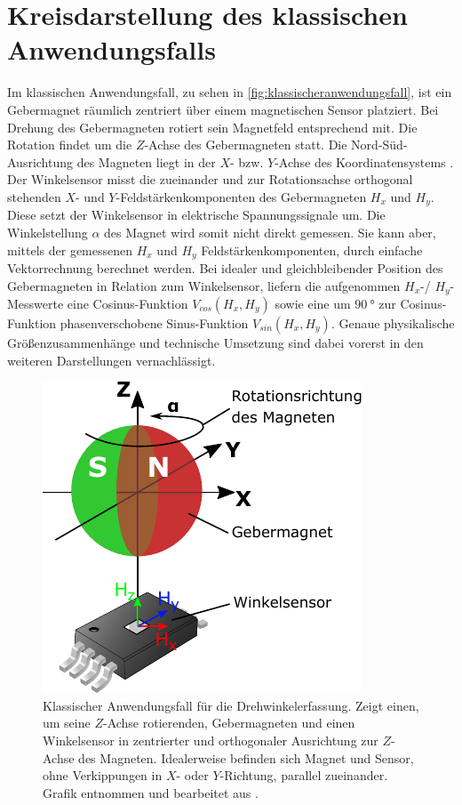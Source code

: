 %

\section{Kreisdarstellung des klassischen Anwendungsfalls}\label{sec:kreisdarstellung-anwendung}


Im klassischen Anwendungsfall, zu sehen in \autoref{fig:klassischeranwendungsfall}, ist ein Gebermagnet räumlich 
zentriert über einem magnetischen Sensor platziert. Bei Drehung des Gebermagneten rotiert sein Magnetfeld entsprechend 
mit. Die Rotation findet um die $Z$-Achse des Gebermagneten statt. Die Nord-Süd-Ausrichtung des Magneten liegt in der 
$X$- bzw. $Y$-Achse des Koordinatensystems \cite{NXPSemiconductors2014}\cite{TDK2016}.
\newline
Der Winkelsensor misst die zueinander und zur Rotationsachse orthogonal stehenden $X$- und $Y$-Feldstärkenkomponenten 
des Gebermagneten $H_x$ und $H_y$. Diese setzt der Winkelsensor in elektrische Spannungssignale um. Die Winkelstellung 
$\alpha$ des Magnet wird somit nicht direkt gemessen. Sie kann aber, mittels der gemessenen $H_x$ und $H_y$ 
Feldstärkenkomponenten, durch einfache Vektorrechnung berechnet werden.
\newline
Bei idealer und gleichbleibender Position des Gebermagneten in Relation zum Winkelsensor, liefern die aufgenommen 
$H_x$-/ $H_y$-Messwerte eine Cosinus-Funktion $V_{cos}(H_x,H_y)$ sowie eine um $\SI{90}{\degree}$ zur Cosinus-Funktion 
phasenverschobene Sinus-Funktion $V_{sin}(H_x,H_y)$. Genaue physikalische Größenzusammenhänge und technische Umsetzung 
sind dabei vorerst in den weiteren Darstellungen vernachlässigt. 


\clearpage


\begin{figure}[tph]
	\centering
	\includegraphics[width=0.35\linewidth]{chapters/images/2-Grundlagen/Klassischer_Anwendungsfall}
	\caption[Klassischer Anwendungsfall für die Drehwinkelerfassung]{Klassischer Anwendungsfall für die 
		Drehwinkelerfassung. Zeigt einen, um seine $Z$-Achse rotierenden, Gebermagneten und einen Winkelsensor in 
		zentrierter und orthogonaler Ausrichtung zur $Z$-Achse des Magneten. Idealerweise befinden sich Magnet und 
		Sensor, 
		ohne Verkippungen in $X$- oder $Y$-Richtung, parallel zueinander. Grafik entnommen und bearbeitet aus 
		\cite{Schuethe2020a}.}
	\label{fig:klassischeranwendungsfall}
\end{figure}


